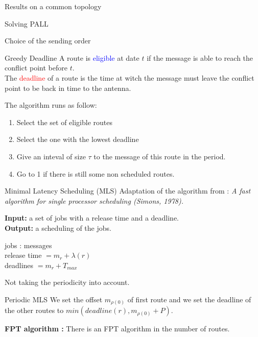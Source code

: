 \documentclass[10 pt]{beamer}
\begin{document}
\begin{section}{Results on a common topology}
\begin{subsection}{Solving PALL}
\begin{frame}{Choice of the sending order}
\end{frame}



\begin{frame}{Greedy Deadline}
A route is \textcolor{blue}{eligible} at date $t$ if the message is able to reach the conflict point before $t$.\\

\vspace{1cm}
The \textcolor{red}{deadline} of a route is the time at witch the message must leave the conflict point to be back in time to the antenna.

\vspace{1cm}
The algorithm runs as follow:
\begin{enumerate}
\item Select the set of eligible routes
\item Select the one with the lowest deadline
\item Give an inteval of size $\tau$ to the message of this route in the period.
\item Go to 1 if there is still some non scheduled routes.
\end{enumerate}
\end{frame}

\begin{frame}{Minimal Latency Scheduling (MLS)}
Adaptation of the algorithm from : {\em A fast algorithm for single processor scheduling (Simons, 1978).}

{\bf Input:} a set of jobs with a release time and a deadline.\\
{\bf Output:} a scheduling of the jobs.\\

\vspace{1cm}
\begin{center}
jobs : messages\\
release time $=m_r + \lambda(r)$\\
deadlines $= m_r + T_{max}$ 
\end{center}

Not taking the periodicity into account.
\end{frame}

\begin{frame}{Periodic MLS}
We set the offset $m_{\rho(0)}$ of first route and we set the deadline of the other routes to $min ( deadline(r), m_{\rho(0)} + P)$.
\vspace{2cm}

{\bf FPT algorithm : } There is an FPT algorithm in the number of routes.
\end{frame}
\end{subsection}


\end{section}
\end{document}
